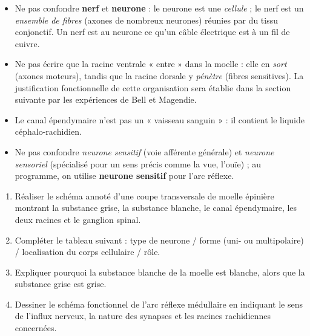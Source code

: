 \documentclass[11pt]{article}
\begin{document}
\begin{attention}
\begin{itemize}
\item Ne pas confondre \textbf{nerf} et \textbf{neurone} : le neurone est une \emph{cellule} ; le nerf est un \emph{ensemble de fibres} (axones de nombreux neurones) réunies par du tissu conjonctif. Un nerf est au neurone ce qu'un câble électrique est à un fil de cuivre.
\item Ne pas écrire que la racine ventrale « entre » dans la moelle : elle en \emph{sort} (axones moteurs), tandis que la racine dorsale y \emph{pénètre} (fibres sensitives). La justification fonctionnelle de cette organisation sera établie dans la section suivante par les expériences de Bell et Magendie.
\item Le canal épendymaire n'est pas un « vaisseau sanguin » : il contient le liquide céphalo-rachidien.
\item Ne pas confondre \emph{neurone sensitif} (voie afférente générale) et \emph{neurone sensoriel} (spécialisé pour un sens précis comme la vue, l'ouïe) ; au programme, on utilise \textbf{neurone sensitif} pour l'arc réflexe.
\end{itemize}
\end{attention}

\begin{exercice}
\begin{enumerate}
\item Réaliser le schéma annoté d'une coupe transversale de moelle épinière montrant la substance grise, la substance blanche, le canal épendymaire, les deux racines et le ganglion spinal.
\item Compléter le tableau suivant : type de neurone / forme (uni- ou multipolaire) / localisation du corps cellulaire / rôle.
\item Expliquer pourquoi la substance blanche de la moelle est blanche, alors que la substance grise est grise.
\item Dessiner le schéma fonctionnel de l'arc réflexe médullaire en indiquant le sens de l'influx nerveux, la nature des synapses et les racines rachidiennes concernées.
\end{enumerate}
\end{exercice}
\end{document}
